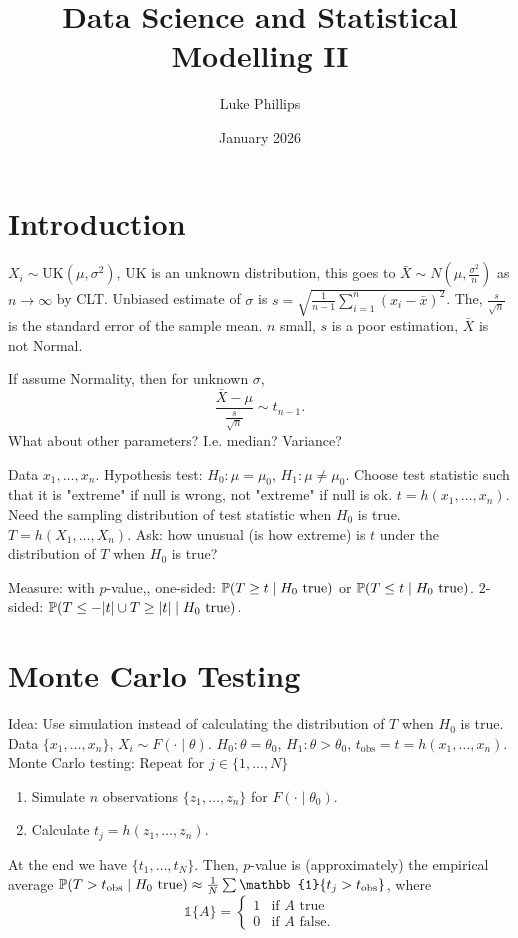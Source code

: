 \documentclass[10pt, a4paper]{article}
\title{Data Science and Statistical Modelling II}
\author{Luke Phillips}
\date{January 2026}
\begin{document}
\maketitle

\newpage

\tableofcontents

\newpage

\section{Introduction}

$X_i \sim \mathrm{UK}(\mu, \sigma ^ 2)$,
$\mathrm{UK}$ is an unknown distribution,
this goes to $\bar{X} \sim N\left(\mu, \frac{\sigma ^ 2}{n}\right)$ as $n \to \infty$ by CLT.
Unbiased estimate of $\sigma$ is $s = \sqrt{\frac{1}{n - 1}\sum_{i = 1}^{n}(x_i - \bar{x}) ^ 2}$.
The,
$\frac{s}{\sqrt{n}}$ is the standard error of the sample mean.
$n$ small,
$s$ is a poor estimation,
$\bar{X}$ is not Normal.

If assume Normality,
then for unknown $\sigma$,
\[
\frac{\bar{X} - \mu}{\frac{s}{\sqrt{n}}} \sim t_{n - 1}.
\]
What about other parameters?
I.e. median?
Variance?

Data $x_1, \dotsc, x_n$.
Hypothesis test:
$H_0 : \mu = \mu_0$,
$H_1 : \mu \neq \mu_0$.
Choose test statistic such that it is
"extreme" if null is wrong,
not "extreme" if null is ok.
$t = h(x_1, \dotsc, x_n)$.
Need the sampling distribution of test statistic when $H_0$ is true.
$T = h(X_1, \dotsc, X_n)$.
Ask:
how unusual
(is how extreme)
is $t$ under the distribution of $T$ when $H_0$ is true?

Measure:
with $p$-value,,
one-sided:
$\P(T \geq t \mid H_0\text{ true})$ or $\P(T \leq t\mid H_0\text{ true})$.
$2$-sided:
$\P(T \leq -|t| \cup T \geq |t| \mid H_0\text{ true})$.

\section{Monte Carlo Testing}
Idea:
Use simulation instead of calculating the distribution of $T$ when $H_0$ is true.
Data $\{x_1, \dotsc, x_n\}$,
$X_i \sim F(\cdot\mid \theta)$.
$H_0: \theta = \theta_0$,
$H_1 : \theta > \theta_0$,
$t_{\text{obs}} = t = h(x_1, \dotsc, x_n)$.
Monte Carlo testing:
Repeat for $j \in \{1, \dotsc, N\}$
\begin{enumerate}[label = (\roman*)]
    \item Simulate $n$ observations $\{z_1, \dotsc, z_n\}$ for $F(\cdot \mid \theta_0)$.

    \item Calculate $t_j = h(z_1, \dotsc, z_n)$.
\end{enumerate}
At the end we have $\{t_1, \dotsc, t_N\}$.
Then,
$p$-value is
(approximately)
the empirical average $\P(T > t_{\text{obs}} \mid H_0\text{ true}) \approx \frac{1}{N}\sum\mathbb{1}\{t_j > t_\text{obs}\}$,
where
\[
\mathbb{1}\{A\} = \begin{cases}
    1 &\text{if $A$ true} \\
    0 &\text{if $A$ false}.
\end{cases}
\]
\end{document}
